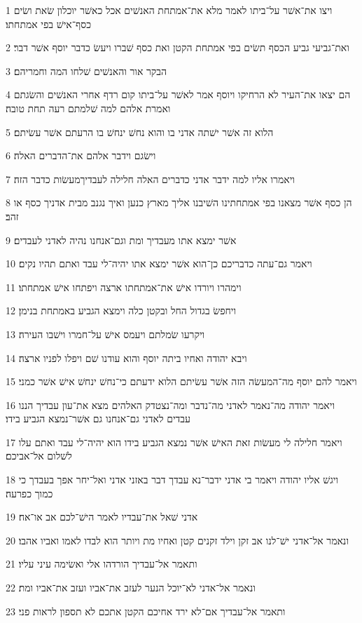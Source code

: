 \par 1 ויצו את־אשׁר על־ביתו לאמר מלא את־אמתחת האנשׁים אכל כאשׁר יוכלון שׂאת ושׂים כסף־אישׁ בפי אמתחתו׃
\par 2 ואת־גביעי גביע הכסף תשׂים בפי אמתחת הקטן ואת כסף שׁברו ויעשׂ כדבר יוסף אשׁר דבר׃
\par 3 הבקר אור והאנשׁים שׁלחו המה וחמריהם׃
\par 4 הם יצאו את־העיר לא הרחיקו ויוסף אמר לאשׁר על־ביתו קום רדף אחרי האנשׁים והשׂגתם ואמרת אלהם למה שׁלמתם רעה תחת טובה׃
\par 5 הלוא זה אשׁר ישׁתה אדני בו והוא נחשׁ ינחשׁ בו הרעתם אשׁר עשׂיתם׃
\par 6 וישׂגם וידבר אלהם את־הדברים האלה׃
\par 7 ויאמרו אליו למה ידבר אדני כדברים האלה חלילה לעבדיךמעשׂות כדבר הזה׃
\par 8 הן כסף אשׁר מצאנו בפי אמתחתינו השׁיבנו אליך מארץ כנען ואיך נגנב מבית אדניך כסף או זהב׃
\par 9 אשׁר ימצא אתו מעבדיך ומת וגם־אנחנו נהיה לאדני לעבדים׃
\par 10 ויאמר גם־עתה כדבריכם כן־הוא אשׁר ימצא אתו יהיה־לי עבד ואתם תהיו נקים׃
\par 11 וימהרו ויורדו אישׁ את־אמתחתו ארצה ויפתחו אישׁ אמתחתו׃
\par 12 ויחפשׂ בגדול החל ובקטן כלה וימצא הגביע באמתחת בנימן׃
\par 13 ויקרעו שׂמלתם ויעמס אישׁ על־חמרו וישׁבו העירה׃
\par 14 ויבא יהודה ואחיו ביתה יוסף והוא עודנו שׁם ויפלו לפניו ארצה׃
\par 15 ויאמר להם יוסף מה־המעשׂה הזה אשׁר עשׂיתם הלוא ידעתם כי־נחשׁ ינחשׁ אישׁ אשׁר כמני׃
\par 16 ויאמר יהודה מה־נאמר לאדני מה־נדבר ומה־נצטדק האלהים מצא את־עון עבדיך הננו עבדים לאדני גם־אנחנו גם אשׁר־נמצא הגביע בידו׃
\par 17 ויאמר חלילה לי מעשׂות זאת האישׁ אשׁר נמצא הגביע בידו הוא יהיה־לי עבד ואתם עלו לשׁלום אל־אביכם׃
\par 18 ויגשׁ אליו יהודה ויאמר בי אדני ידבר־נא עבדך דבר באזני אדני ואל־יחר אפך בעבדך כי כמוך כפרעה׃
\par 19 אדני שׁאל את־עבדיו לאמר הישׁ־לכם אב או־אח׃
\par 20 ונאמר אל־אדני ישׁ־לנו אב זקן וילד זקנים קטן ואחיו מת ויותר הוא לבדו לאמו ואביו אהבו׃
\par 21 ותאמר אל־עבדיך הורדהו אלי ואשׂימה עיני עליו׃
\par 22 ונאמר אל־אדני לא־יוכל הנער לעזב את־אביו ועזב את־אביו ומת׃
\par 23 ותאמר אל־עבדיך אם־לא ירד אחיכם הקטן אתכם לא תספון לראות פני׃
